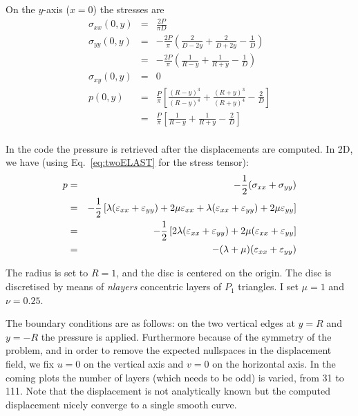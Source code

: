 On the $y$-axis ($x=0$) the stresses are 
\begin{eqnarray}
\sigma_{xx}(0,y) &=& \frac{2P}{\pi D} \\
\sigma_{yy}(0,y) 
&=& -\frac{2P}{\pi} \left( \frac{2}{D-2y} + \frac{2}{D+2y} -\frac{1}{D} \right) \\
&=& -\frac{2P}{\pi} \left( \frac{1}{R-y} + \frac{1}{R+y} -\frac{1}{D} \right) \\
\sigma_{xy} (0,y) &=& 0 \\
p(0,y) 
&=& \frac{P}{\pi} \left[ \frac{(R-y)^3 }{(R-y)^4} + \frac{ (R+y)^3  }{(R+y)^4}  - \frac{2}{D} \right] \\
&=& \frac{P}{\pi} \left[ \frac{1}{R-y} + \frac{ 1 }{R+y}  - \frac{2}{D} \right] \\
\end{eqnarray}

In the code the pressure is retrieved after the displacements are computed. 
In 2D, we have (using Eq.~\ref{eq:twoELAST} for the stress tensor):
\begin{eqnarray}
p
&=& -\frac{1}{2}(\sigma_{xx} + \sigma_{yy}) \nonumber\\
&=& -\frac{1}{2} \left[
\lambda (\varepsilon_{xx}+\varepsilon_{yy}) + 2 \mu \varepsilon_{xx} +
\lambda (\varepsilon_{xx}+\varepsilon_{yy}) + 2 \mu \varepsilon_{yy} 
\right] \\
&=& -\frac{1}{2} \left[
2\lambda (\varepsilon_{xx}+\varepsilon_{yy}) + 2 \mu (\varepsilon_{xx} + \varepsilon_{yy} \right]\nonumber\\
&=& -(\lambda+\mu) (\varepsilon_{xx}+\varepsilon_{yy}) 
\end{eqnarray}

The radius is set to $R=1$, and the disc is centered on the origin. The disc 
is discretised by means of {\sl nlayers} concentric layers of $P_1$ triangles.
I set $\mu=1$ and $\nu=0.25$. 

The boundary conditions are as follows: on the two vertical edges at $y=R$ and $y=-R$ 
the pressure is applied. Furthermore because of the symmetry of the problem, 
and in order to remove the expected nullspaces in the displacement field, 
we fix $u=0$ on the vertical axis and $v=0$ on the horizontal axis.
In the coming plots the number of layers (which needs to be odd) is varied, from 31 to 111.
Note that the displacement is not analytically known but the computed displacement 
nicely converge to a single smooth curve.


